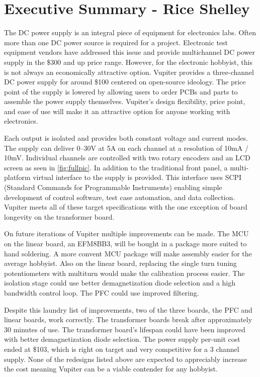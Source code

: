 \documentclass[15pt]{article}
\begin{document}
\section{Executive Summary - Rice Shelley}
The DC power supply is an integral piece of equipment for electronics labs. Often more than one DC power source is required for a project. Electronic test equipment vendors have addressed this issue and provide multichannel DC power supply in the \$300\cite{expensive} and up price range. However, for the electronic hobbyist, this is not always an economically attractive option. Vupiter provides a three-channel DC power supply for around \$100 centered on open-source ideology. The price point of the supply is lowered by allowing users to order PCBs and parts to assemble the power supply themselves. Vupiter’s design flexibility, price point, and ease of use will make it an attractive option for anyone working with electronics. 

Each output is isolated and provides both constant voltage and current modes. The supply can deliver 0–30V at 5A on each channel at a resolution of 10mA / 10mV. Individual channels are controlled with two rotary encoders and an LCD screen as seen in \autoref{fig:fullpic}. In addition to the traditional front panel, a multi-platform virtual interface to the supply is provided. This interface uses SCPI (Standard Commands for Programmable Instruments) enabling simple development of control software, test case automation, and data collection. Vupiter meets all of these target specifications with the one exception of board longevity on the transformer board.

On future iterations of Vupiter multiple improvements can be made. The MCU on the linear board, an EFM8BB3, will be bought in a package more suited to hand soldering. A more convent MCU package will make assembly easier for the average hobbyist. Also on the linear board, replacing the single turn tuning potentiometers with multiturn would make the calibration process easier. The isolation stage could use better demagnetization diode selection and a high bandwidth control loop. The PFC could use improved filtering.

Despite this laundry list of improvements, two of the three boards, the PFC and linear boards, work correctly. The transformer boards break after approximately 30 minutes of use. The transformer board's lifespan could have been improved with better demagnetization diode selection. The power supply per-unit cost ended at \$103, which is right on target and very competitive for a 3 channel supply. None of the redesigns listed above are expected to appreciably increase the cost meaning Vupiter can be a viable contender for any hobbyist.
\end{document}
